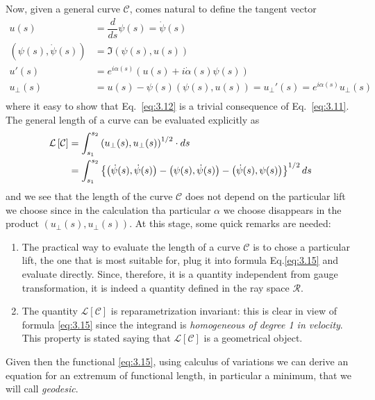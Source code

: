 Now, given a general curve $ \mathcal{C} $, comes natural to define the tangent vector 
\begin{align}
	u(s)&=\dfrac{d}{ds}\psi(s)=\dot{\psi}(s)\label{eq:3.11}\\
	(\psi(s),\dot{\psi}(s))&=\Im(\psi(s),u(s))\label{eq:3.12}\\
	u'(s)&=e^{i\alpha(s)}(u(s)+i\dot{\alpha}(s)\psi(s))\\
	u_{\perp}(s)&=u(s)-\psi(s)(\psi(s),u(s))=u_{\perp}'(s)=e^{i\alpha(s)}u_{\perp}(s)\\
\end{align}
where it easy to show that Eq.~\eqref{eq:3.12} is a trivial consequence of Eq.~\eqref{eq:3.11}. The general length of a curve can be evaluated explicitly as
\begin{align}
	\mathcal{L}\left[\mathcal{C}\right]&=\int_{s_1}^{s_2}\left(u_{\perp}(s),u_{\perp}(s)\right)^{1/2}\cdot\mathop{}\!d s \label{eq:3.15}\\
	&=\int_{s_1}^{s_2}\left\{\left(\dot{\psi}(s),\dot{\psi}(s)\right)-\left(\psi(s),\dot{\psi}(s)\right)-\left(\dot{\psi}(s),\psi(s)\right) \right\}^{1/2} \mathop{}\!d s
\end{align}
and we see that the length of the curve $ \mathcal{C} $ does not depend on the particular lift we choose since in the calculation tha particular $ \alpha $ we choose disappears in the product $ \left(u_{\perp}(s),u_{\perp}(s)\right) $. At this stage, some quick remarks are needed:
\begin{enumerate}
	\item The practical way to evaluate the length of a curve $ \mathcal{C} $ is to chose a particular lift, the one that is most suitable for, plug it into formula Eq.\eqref{eq:3.15} and evaluate directly. Since, therefore, it is a quantity independent from gauge transformation, it is indeed a quantity defined in the ray space $ \mathcal{R} $.
	\item The quantity $ \mathcal{L}\left[\mathcal{C}\right] $ is reparametrization invariant: this is clear in view of formula \eqref{eq:3.15} since the integrand is \textit{homogeneous of degree 1 in velocity}. This property is stated saying that $ \mathcal{L}\left[\mathcal{C}\right] $ is a geometrical object. 
\end{enumerate}
Given then the functional \eqref{eq:3.15}, using calculus of variations we can derive an equation for an extremum of functional length, in particular a minimum, that we will call \textit{geodesic}.
